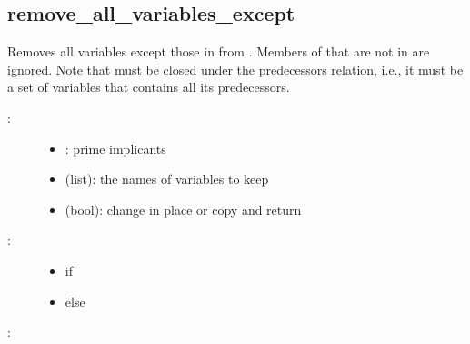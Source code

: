 \documentclass[letterpaper,10pt,english]{sphinxmanual}
\begin{document}
\subsection{remove\_all\_variables\_except}
\label{\detokenize{PrimeImplicants:remove-all-variables-except}}\label{\detokenize{PrimeImplicants:id14}}

\begin{fulllineitems}
\label{\detokenize{PrimeImplicants:PyBoolNet.PrimeImplicants.remove_all_variables_except}}
Removes all variables except those in  from .
Members of  that are not in  are ignored.
Note that  must be closed under the predecessors relation, i.e.,
it must be a set of variables that contains all its predecessors.
\begin{description}
\item[{:}] \leavevmode\begin{itemize}
\item {} 
: prime implicants

\item {} 
 (list): the names of variables to keep

\item {} 
 (bool): change  in place or copy and return

\end{itemize}

\item[{:}] \leavevmode\begin{itemize}
\item {} 
 if 

\item {} 
 else

\end{itemize}

\end{description}

:

\begin{sphinxVerbatim}[commandchars=\\\{\}]
  \PYG{p}{[}\PYG{p}{]}
 
\end{sphinxVerbatim}


\end{fulllineitems}
\end{document}
